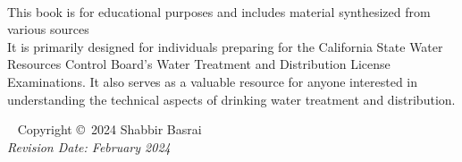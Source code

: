 \documentclass[11pt,fleqn]{book} %
\begin{document}

\newpage
~\vfill
\thispagestyle{empty}


%
%

This book is for educational purposes and includes material synthesized from various sources\\
\vspace{0.25cm}
It is primarily designed for individuals preparing for the California State Water Resources Control Board's Water Treatment and Distribution License Examinations. It also serves as a valuable resource for anyone interested in understanding the technical aspects of drinking water treatment and distribution.

~\vfill
\noindent Copyright \copyright\ 2024 Shabbir Basrai\\ %
\noindent \textit{Revision Date: February 2024} %




\pagestyle{empty} %

\tableofcontents %
\listoffigures
\listoftables
\cleardoublepage %

\pagestyle{fancy} %

\end{document}
